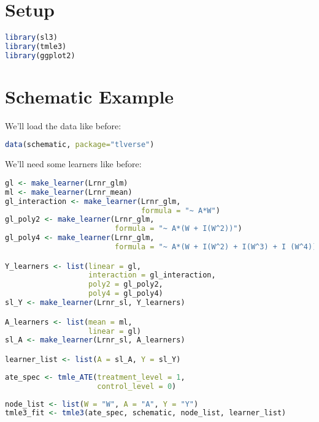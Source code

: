 \documentclass[
  12pt, krantz2,
]{krantz}
\theoremstyle{definition}
\theoremstyle{definition}
\theoremstyle{definition}
\newcommand{\1}{\mathbbm{1}}
\begin{document}
\hypertarget{setup-2}{%
\section{Setup}\label{setup-2}}

\begin{lstlisting}[language=R]
library(sl3)
library(tmle3)
library(ggplot2)
\end{lstlisting}

\hypertarget{schematic-example-3}{%
\section{Schematic Example}\label{schematic-example-3}}

We'll load the data like before:

\begin{lstlisting}[language=R]
data(schematic, package="tlverse")
\end{lstlisting}

We'll need some learners like before:

\begin{lstlisting}[language=R]
gl <- make_learner(Lrnr_glm)
ml <- make_learner(Lrnr_mean)
gl_interaction <- make_learner(Lrnr_glm, 
                               formula = "~ A*W")
gl_poly2 <- make_learner(Lrnr_glm, 
                         formula = "~ A*(W + I(W^2))")
gl_poly4 <- make_learner(Lrnr_glm, 
                         formula = "~ A*(W + I(W^2) + I(W^3) + I (W^4))")

Y_learners <- list(linear = gl, 
                   interaction = gl_interaction, 
                   poly2 = gl_poly2,
                   poly4 = gl_poly4)
sl_Y <- make_learner(Lrnr_sl, Y_learners)

A_learners <- list(mean = ml,
                   linear = gl)
sl_A <- make_learner(Lrnr_sl, A_learners)

learner_list <- list(A = sl_A, Y = sl_Y)
\end{lstlisting}

\begin{lstlisting}[language=R]
ate_spec <- tmle_ATE(treatment_level = 1,
                     control_level = 0)
\end{lstlisting}

\begin{lstlisting}[language=R]
node_list <- list(W = "W", A = "A", Y = "Y")
tmle3_fit <- tmle3(ate_spec, schematic, node_list, learner_list)
\end{lstlisting}
\end{document}
